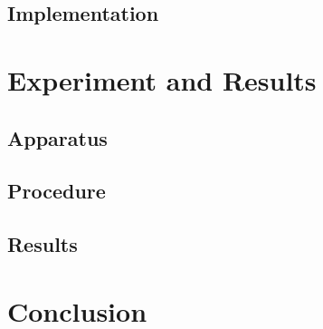 \documentclass{llncs}
\begin{document}



\subsection{Implementation}

\section{Experiment and Results}

\subsection{Apparatus}

\subsection{Procedure}

\subsection{Results}

\section{Conclusion}

\end{document}
